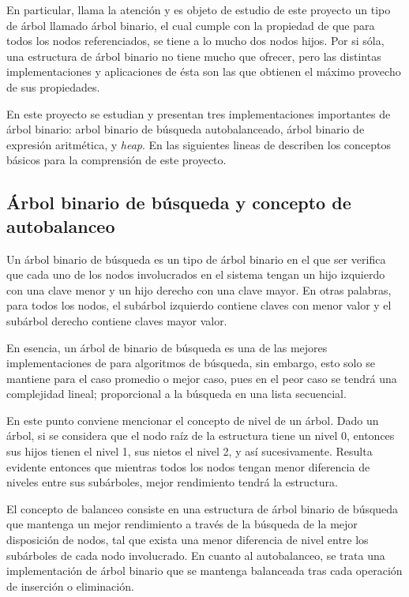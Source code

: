 \documentclass[letterpaper, 11pt]{article}
\begin{document}
	En particular, llama la atención y es objeto de estudio de este proyecto un tipo de árbol llamado árbol binario, el cual cumple con la propiedad de que para todos los nodos referenciados, se tiene a lo mucho dos nodos hijos. Por si sóla, una estructura de árbol binario no tiene mucho que ofrecer, pero las distintas implementaciones y aplicaciones de ésta son las que obtienen el máximo provecho de sus propiedades. 
	
	En este proyecto se estudian y presentan tres implementaciones importantes de árbol binario: arbol binario de búsqueda autobalanceado, árbol binario de expresión aritmética, y \textit{heap}. En las siguientes lineas de describen los conceptos básicos para la comprensión de este proyecto.
	
	\subsection*{Árbol binario de búsqueda y concepto de autobalanceo}
	
	Un árbol binario de búsqueda es un tipo de árbol binario en el que ser verifica que cada uno de los nodos involucrados en el sistema tengan un hijo izquierdo con una clave menor y un hijo derecho con una clave mayor. En otras palabras, para todos los nodos, el subárbol izquierdo contiene claves con menor valor y el subárbol derecho contiene claves mayor valor. 
	
	En esencia, un árbol de binario de búsqueda es una de las mejores implementaciones de para algoritmos de búsqueda, sin embargo, esto solo se mantiene para el caso promedio o mejor caso, pues en el peor caso se tendrá una complejidad lineal; proporcional a la búsqueda en una lista secuencial. 
	
	En este punto conviene mencionar el concepto de nivel de un árbol. Dado un árbol, si se considera que el nodo raíz de la estructura tiene un nivel 0, entonces sus hijos tienen el nivel 1, sus nietos el nivel 2, y así sucesivamente. Resulta evidente entonces que mientras todos los nodos tengan menor diferencia de niveles entre sus subárboles, mejor rendimiento tendrá la estructura.
	
	El concepto de balanceo consiste en una estructura de árbol binario de búsqueda que mantenga un mejor rendimiento a través de la búsqueda de la mejor disposición de nodos, tal que exista una menor diferencia de nivel entre los subárboles de cada nodo involucrado. En cuanto al autobalanceo, se trata una implementación de árbol binario que se mantenga balanceada tras cada operación de inserción o eliminación.
	
\end{document}
